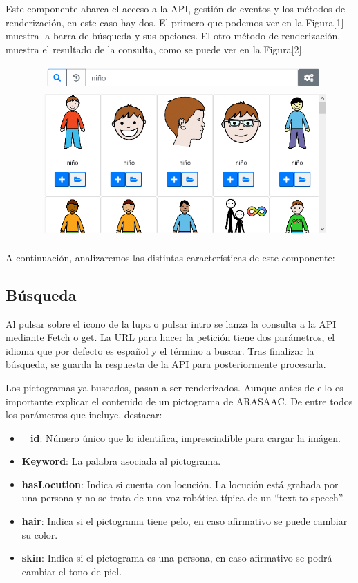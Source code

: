 Este componente abarca el acceso a la API, gestión de eventos y los métodos de renderización, en este caso hay dos. El primero que podemos ver en la Figura[1] muestra la barra de búsqueda y sus opciones. El otro método de renderización, muestra el resultado de la consulta, como se puede ver en la Figura[2]. 


\begin{figure}[h!]
	\centering
	\includegraphics[width=0.7\linewidth]{Imagenes/Bitmap/buscarPicto}
	\caption{}
	\label{fig:buscarpicto}
\end{figure}


A continuación, analizaremos las distintas características de este componente:


\subsection{Búsqueda}

Al pulsar sobre el icono de la lupa o pulsar intro se lanza la consulta a la API mediante Fetch o get. La URL para hacer la petición tiene dos parámetros, el idioma que por defecto es español y el término a buscar. Tras finalizar la búsqueda, se guarda la respuesta de la API para posteriormente procesarla.


Los pictogramas ya buscados, pasan a ser renderizados. Aunque antes de ello es importante explicar el contenido de un pictograma de ARASAAC. De entre todos los parámetros que incluye, destacar: 



\begin{itemize}
	\item \textbf{\_id}: Número único que lo identifica, imprescindible para cargar la imágen.
	
	\item \textbf{Keyword}: La palabra asociada al pictograma.
	
	\item \textbf{hasLocution}: Indica si cuenta con locución. La locución está grabada por una persona y no se trata de una voz robótica típica de un “text to speech”.
	
	\item \textbf{hair}: Indica si el pictograma tiene pelo, en caso afirmativo se puede cambiar su color. 
	
	\item \textbf{skin}: Indica si el pictograma es una persona, en caso afirmativo se podrá cambiar el tono de piel.
		
\end{itemize}

